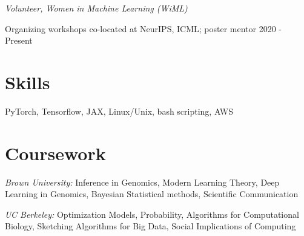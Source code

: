 \documentclass[mm,line]{res}
\begin{document}
\begin{resume}
{\em Volunteer, Women in Machine Learning (WiML)}

\vspace{-.4cm}
{Organizing workshops co-located at NeurIPS, ICML; poster mentor} \hfill {2020 - Present}



\section{\sc Skills}

PyTorch, Tensorflow, JAX, Linux/Unix, bash scripting, AWS

\section{\sc Coursework}

\emph{Brown University:} Inference in Genomics, Modern Learning Theory, Deep Learning in Genomics, Bayesian Statistical methods, Scientific Communication

\emph{UC Berkeley:} Optimization Models, Probability, Algorithms for Computational Biology, Sketching Algorithms for Big Data, Social Implications of Computing


\vspace*{-0.15in}

\end{resume}
\end{document}
